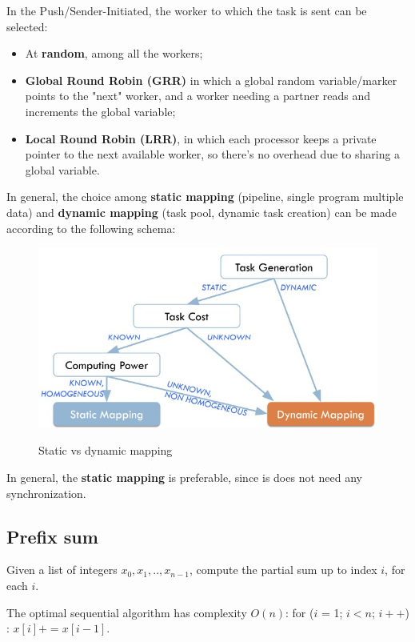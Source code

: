 In the Push/Sender-Initiated, the worker to which the task is sent can be selected:

\begin{itemize}
    \item At \textbf{random}, among all the workers;
    \item \textbf{Global Round Robin (GRR)} in which a global random variable/marker points to the "next" worker, and a worker needing a partner reads and increments the global variable;
    \item \textbf{Local Round Robin (LRR)}, in which each processor keeps a private pointer to the next available worker, so there's no overhead due to sharing a global variable.
\end{itemize}

In general, the choice among \textbf{static mapping} (pipeline, single program multiple data) and \textbf{dynamic mapping} (task pool, dynamic task creation) can be made according to the following schema:

\begin{figure}[h!]
		\centering
		\includegraphics[scale = 1.8]{img/dynamic vs static mapping.jpg}
        \label{dy vs st}
        \caption{Static vs dynamic mapping}
\end{figure}

In general, the \textbf{static mapping} is preferable, since is does not need any synchronization.

\subsection{Prefix sum}
Given a list of integers $x_0, x_1, .., x_{n-1}$, compute the partial sum up to index $i$, for each $i$. 

The optimal sequential algorithm has complexity $O(n)$: for ($i$ = 1; $i<n$; $i++$) : $x[i] += x[i-1]$.

